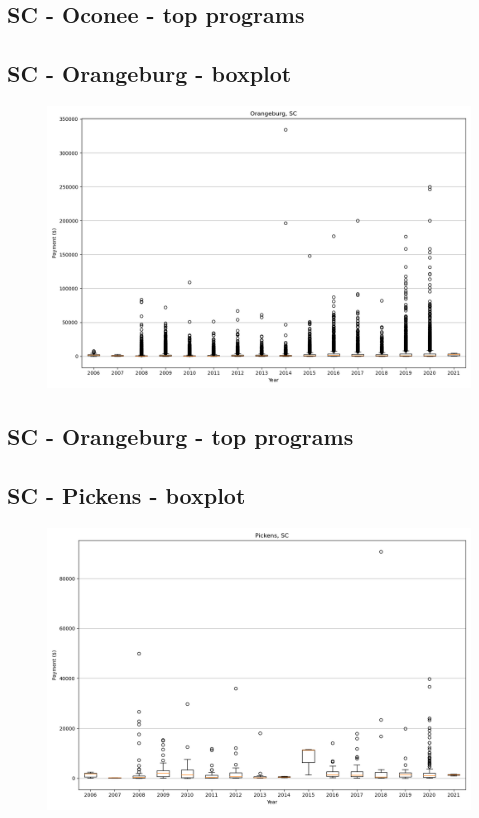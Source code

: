 \subsection*{SC - Oconee - top programs}

\newpage
\subsection*{SC - Orangeburg - boxplot}
\begin{figure}[h]
\centering
\includegraphics[width=7in]{../output/boxplots/counties/Orangeburg-SC_boxplot.png}
\end{figure}


\subsection*{SC - Orangeburg - top programs}

\newpage
\subsection*{SC - Pickens - boxplot}
\begin{figure}[h]
\centering
\includegraphics[width=7in]{../output/boxplots/counties/Pickens-SC_boxplot.png}
\end{figure}


